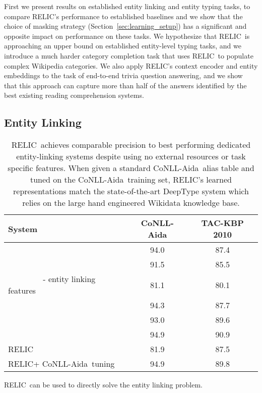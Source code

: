 \documentclass{article} \usepackage{iclr2020_conference,times}
\newcommand{\ack}{RELIC\xspace}
\newcommand{\tac}{TAC-KBP 2010}
\newcommand{\conll}{CoNLL-Aida}
\begin{document}
First we present results on established entity linking and entity typing tasks, to compare \ack's performance to established baselines and we show that the choice of masking strategy (Section~\ref{sec:learning_setup}) has a significant and opposite impact on performance on these tasks. 
We hypothesize that \ack~is approaching an upper bound on established entity-level typing tasks, and we introduce a much harder category completion task that uses \ack~to populate complex Wikipedia categories. We also apply \ack's context encoder and entity embeddings to the task of end-to-end trivia question answering, and we show that this approach can capture more than half of the answers identified by the best existing reading comprehension systems.

\subsection{Entity Linking} \label{sec:entity_linking_results}
\begin{table}[]
    \centering
    \begin{tabular}{|l|c|c|}
    \hline
    System & \conll & \tac \\\hline
    \citealt{Sil2018-qo} & 94.0 & 87.4 \\
    \citealt{yamada2016joint} & 91.5 &  85.5 \\ 
    ~~~~~~~~ - entity linking features & 81.1 & 80.1 \\
    \citealt{yamada-etal-2017-learning}& 94.3 & 87.7 \\
    \citealt{Radhakrishnan2018-zj} & 93.0 & 89.6 \\
    \citealt{Raiman2018-hm} & 94.9 & 90.9 \\
    \ack & 81.9 & 87.5 \\
    \ack + \conll~tuning & 94.9\footnotemark & 89.8 \\
    \hline
    \end{tabular}
    \caption{\ack~achieves comparable precision to best performing dedicated entity-linking systems despite using no external resources or task specific features. When given a standard \conll~alias table and tuned on the \conll~training set, \ack's learned representations match the state-of-the-art DeepType system which relies on the large hand engineered Wikidata knowledge base.}
    \label{tab:entity_linking}
\end{table}
\ack~can be used to directly solve the entity linking problem.
\end{document}
